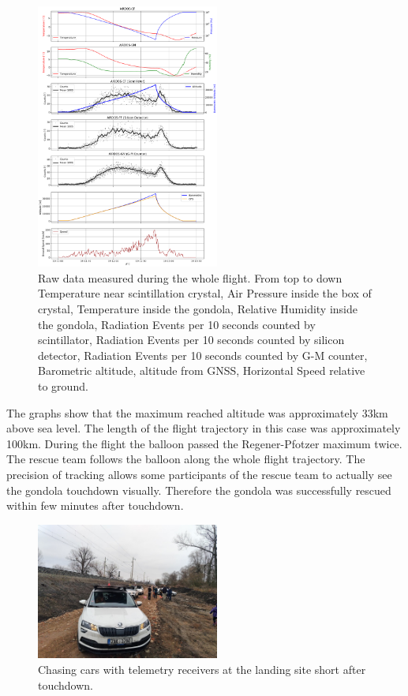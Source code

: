 \documentclass{Rpd}
\begin{document}
\begin{center}
\begin{figure}%
	\centerline{\includegraphics[width=60mm]{img/FIK-6_RAW_data.png}}
	\caption{Raw data measured during the whole flight. From top to down Temperature near scintillation crystal, Air Pressure inside the box of crystal, Temperature inside the gondola, Relative Humidity inside the gondola, Radiation Events per 10 seconds counted by scintillator, Radiation Events per 10 seconds counted by silicon detector, Radiation Events per 10 seconds counted by G-M counter, Barometric altitude, altitude from GNSS, Horizontal Speed relative to ground. \label{FIK-6_RAW_data}}
\end{figure}
\end{center}


The graphs show that the maximum reached altitude was approximately 33km above sea level. The length of the flight trajectory in this case was approximately 100km. During the flight the balloon passed the Regener-Pfotzer maximum twice. The rescue team follows the balloon along the whole flight trajectory. The precision of tracking allows some participants of the rescue team to actually see the gondola touchdown visually. Therefore the gondola was successfully rescued within few minutes after touchdown.

\begin{center}
\begin{figure}%
	\centerline{\includegraphics[width=60mm]{img/FIK-6_rescue_team.png}}
	\caption{Chasing cars with telemetry receivers at the landing site short after touchdown. \label{FIK-6_rescue_team}}
\end{figure}
\end{center}
\end{document}

